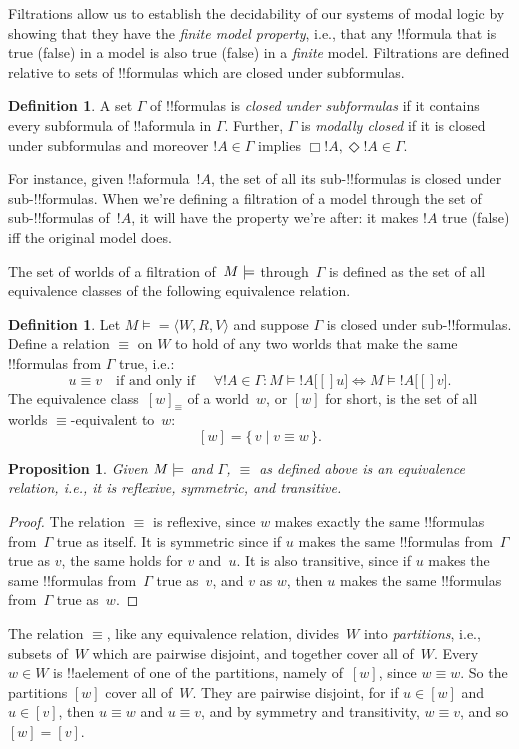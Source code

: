 \documentclass[10pt,a4paper]{article}
\theoremstyle{plain}
\newtheorem{prop}[thm]{Proposition}
\theoremstyle{definition}
\newtheorem{defn}[thm]{Definition}
\theoremstyle{remark}
\newcommand*{\ollabel}[1]{\label{#1}}
\providecommand{\mSat}[3]{\ensuremath{#1 \models #2[#3]}}
\providecommand{\mModel}[2]{\ensuremath{#1 \models #2}}
\providecommand{\tuple}[1]{\langle #1 \rangle}
\providecommand{\Setabs}[2]{\{\, #1 \mid #2 \,\}}
\begin{document}
Filtrations allow us to establish the decidability of our systems of
modal logic by showing that they have the \emph{finite model
  property}, i.e., that any !!{formula} that is true (false) in a
model is also true (false) in a \emph{finite} model.  Filtrations are
defined relative to sets of !!{formula}s which are closed under
subformulas.

\begin{defn}\ollabel{defn:modallyclosed}
  A set $\Gamma$ of !!{formula}s is \emph{closed under subformulas} if it
  contains every subformula of !!a{formula} in $\Gamma$. Further,
  $\Gamma$ is \emph{modally closed} if it is closed under subformulas
  and moreover $!A \in \Gamma$ implies $\Box!A,
  \Diamond!A \in \Gamma$. 
\end{defn}

For instance, given !!a{formula}~$!A$, the set of all its
sub-!!{formula}s is closed under sub-!!{formula}s. When we're defining
a filtration of a model through the set of sub-!!{formula}s of~$!A$,
it will have the property we're after: it makes $!A$ true (false) iff
the original model does.

The set of worlds of a filtration of~$\mModel{M}$ through~$\Gamma$ is
defined as the set of all equivalence classes of the following
equivalence relation.

\begin{defn}
Let $\mModel{M} =\tuple{W, R, V}$ and suppose $\Gamma$ is closed under
sub-!!{formula}s. Define a relation $\equiv$ on $W$ to hold of any two
worlds that make the same !!{formula}s from $\Gamma$ true, i.e.:
\[
u \equiv v \quad \text{if and only if } \quad 
\forall !A \in \Gamma : \mSat{M}{!A}[u] \Leftrightarrow \mSat{M}{!A}[v].
\]
The equivalence class~$[w]_\equiv$ of a world~$w$, or $[w]$ for short,
is the set of all worlds $\equiv$-equivalent to~$w$:
\[
[w] = \Setabs{v}{v \equiv w}.
\]
\end{defn}

\begin{prop}
  Given $\mModel{M}$ and $\Gamma$, $\equiv$ as defined above is an
  equivalence relation, i.e., it is reflexive, symmetric, and
  transitive.
\end{prop}

\begin{proof}
  The relation $\equiv$ is reflexive, since $w$ makes exactly the same
  !!{formula}s from~$\Gamma$ true as itself. It is symmetric since if
  $u$ makes the same !!{formula}s from~$\Gamma$ true as $v$, the same
  holds for $v$ and~$u$. It is also transitive, since if $u$ makes the
  same !!{formula}s from~$\Gamma$ true as~$v$, and $v$ as $w$, then
  $u$ makes the same !!{formula}s from~$\Gamma$ true as~$w$.
\end{proof}

The relation $\equiv$, like any equivalence relation, divides~$W$ into
\emph{partitions}, i.e., subsets of~$W$ which are pairwise disjoint,
and together cover all of~$W$. Every $w \in W$ is !!a{element} of one
of the partitions, namely of~$[w]$, since $w \equiv w$. So the
partitions $[w]$ cover all of~$W$. They are pairwise disjoint, for if
$u \in [w]$ and $u \in [v]$, then $u \equiv w$ and $u \equiv v$, and
by symmetry and transitivity, $w \equiv v$, and so $[w] = [v]$.
\end{document}
